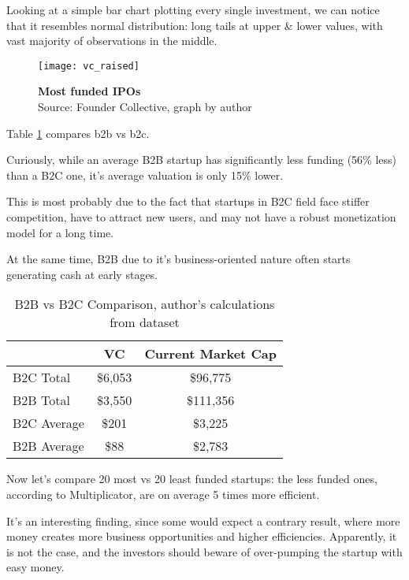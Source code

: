 Looking at a simple bar chart plotting every single investment, we can notice that it resembles normal distribution: long tails at upper & lower values, with vast majority of observations in the middle.

\begin{figure}[ht]
    \centering
    \texttt{[image: vc\_raised]}
    \caption{ \textbf{Most funded IPOs}\\Source: Founder Collective, graph by author}
\end{figure}



Table \ref{tab:b2b_b2c} compares b2b vs b2c.

Curiously, while an average B2B startup has significantly less funding (56\% less) than a B2C one, it's average valuation is only 15\% lower.

This is most probably due to the fact that startups in B2C field face stiffer competition, have to attract new users, and may not have a robust monetization model for a long time.

At the same time, B2B due to it's business-oriented nature often starts generating cash at early stages.


\begin{table}[bp!]
    \centering
    \begin{tabular}{lcc}
        \toprule
         &      VC & Current Market Cap \\
        \midrule
        B2C Total   &  \$6,053 &            \$96,775 \\
        B2B Total   &  \$3,550 &           \$111,356 \\
        B2C Average &    \$201 &             \$3,225 \\
        B2B Average &     \$88 &             \$2,783 \\
        \bottomrule
    \end{tabular}
    \caption{B2B vs B2C Comparison, author's calculations from dataset}
    \label{tab:b2b_b2c}
\end{table}


Now let's compare 20 most vs 20 least funded startups: the less funded ones, according to Multiplicator, are on average 5 times more efficient.

It's an interesting finding, since some would expect a contrary result, where more money creates more business opportunities and higher efficiencies. Apparently, it is not the case, and the investors should beware of over-pumping the startup with easy money.

